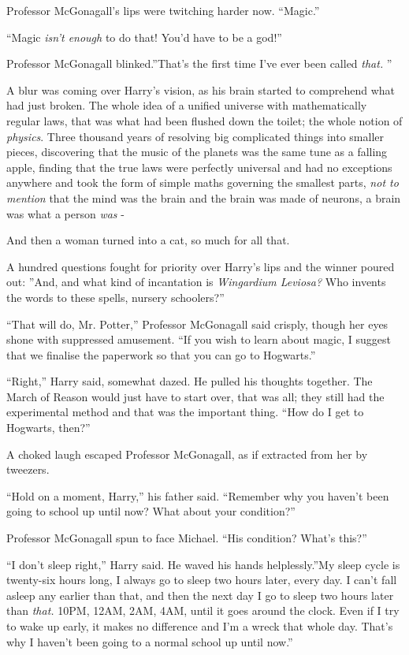 Professor McGonagall's lips were twitching harder now. ``Magic.''

``Magic \emph{isn't enough} to do that! You'd have to be a god!''

Professor McGonagall blinked.''That's the first time I've ever been
called \emph{that.} ''

A blur was coming over Harry's vision, as his brain started to
comprehend what had just broken. The whole idea of a unified universe
with mathematically regular laws, that was what had been flushed down
the toilet; the whole notion of \emph{physics}. Three thousand years of
resolving big complicated things into smaller pieces, discovering that
the music of the planets was the same tune as a falling apple, finding
that the true laws were perfectly universal and had no exceptions
anywhere and took the form of simple maths governing the smallest parts,
\emph{not to mention} that the mind was the brain and the brain was made
of neurons, a brain was what a person \emph{was} -

And then a woman turned into a cat, so much for all that.

A hundred questions fought for priority over Harry's lips and the winner
poured out: ''And, and what kind of incantation is \emph{Wingardium
Leviosa?} Who invents the words to these spells, nursery schoolers?''

``That will do, Mr. Potter,'' Professor McGonagall said crisply, though
her eyes shone with suppressed amusement. ``If you wish to learn about
magic, I suggest that we finalise the paperwork so that you can go to
Hogwarts.''

``Right,'' Harry said, somewhat dazed. He pulled his thoughts together.
The March of Reason would just have to start over, that was all; they
still had the experimental method and that was the important thing.
``How do I get to Hogwarts, then?''

A choked laugh escaped Professor McGonagall, as if extracted from her by
tweezers.

``Hold on a moment, Harry,'' his father said. ``Remember why you haven't
been going to school up until now? What about your condition?''

Professor McGonagall spun to face Michael. ``His condition? What's
this?''

``I don't sleep right,'' Harry said. He waved his hands helplessly.''My
sleep cycle is twenty-six hours long, I always go to sleep two hours
later, every day. I can't fall asleep any earlier than that, and then
the next day I go to sleep two hours later than \emph{that.} 10PM, 12AM,
2AM, 4AM, until it goes around the clock. Even if I try to wake up
early, it makes no difference and I'm a wreck that whole day. That's why
I haven't been going to a normal school up until now.''

